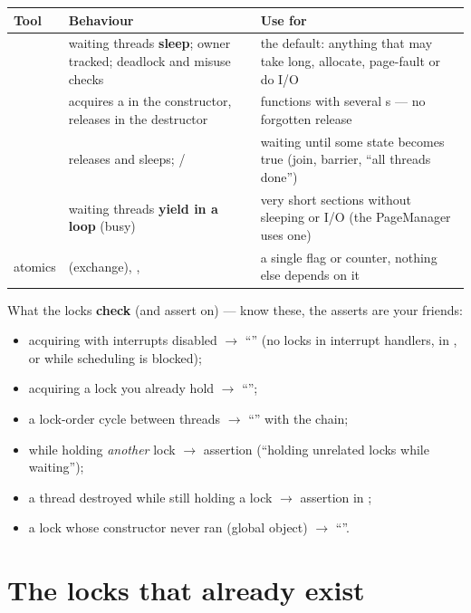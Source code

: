 \begin{center}
\small
\begin{tabular}{L{2.8cm}L{5.8cm}L{6.2cm}}
\toprule
\textbf{Tool} & \textbf{Behaviour} & \textbf{Use for} \\
\midrule
{} & waiting threads \textbf{sleep}; owner tracked; deadlock and misuse checks & the default: anything that may take long, allocate, page-fault or do I/O \\
 & acquires a  in the constructor, releases in the destructor & functions with several s --- no forgotten release \\
 &  releases  and sleeps; / & waiting until some state becomes true (join, barrier, ``all threads done'') \\
 & waiting threads \textbf{yield in a loop} (busy) & very short sections without sleeping or I/O (the PageManager uses one) \\
atomics &  (exchange), ,  & a single flag or counter, nothing else depends on it \\
\bottomrule
\end{tabular}
\end{center}

What the locks \textbf{check} (and assert on) --- know these, the asserts are your friends:
\begin{itemize}
\item acquiring with interrupts disabled $\to$ ``''
  (no locks in interrupt handlers, in , or while scheduling is blocked);
\item acquiring a lock you already hold $\to$ ``'';
\item a lock-order cycle between threads $\to$ ``'' with the chain;
\item {} while holding \emph{another} lock $\to$ assertion
  (``holding unrelated locks while waiting'');
\item a thread destroyed while still holding a lock $\to$ assertion in ;
\item a lock whose constructor never ran (global object) $\to$ ``''.
\end{itemize}

\section{The locks that already exist}

